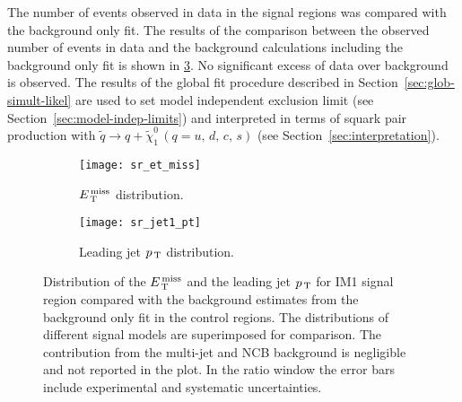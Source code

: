 The number of events observed in data in the signal regions was compared with
the background only fit. The results of the comparison between the observed
number of events in data and the background calculations including the
background only fit is shown in \cref{fig:sr_plots}. No significant excess of
data over background is observed. The results of the global fit procedure
described in Section~\ref{sec:glob-simult-likel} are used to set model
independent exclusion limit (see Section~\ref{sec:model-indep-limits}) and
interpreted in terms of squark pair production with
$\widetilde{q} \rightarrow q + \widetilde{\chi}_1^0\, (q = u,\, d,\, c,\, s)$
(see Section~\ref{sec:interpretation}).
\begin{figure}[!th]
  \centering
  \begin{subfigure}[t]{.48\linewidth}
    \texttt{[image: sr\_et\_miss]}
    \caption{$E_\mathrm{\, T}^\mathrm{\, miss}$ distribution.}
    \label{fig:sr_et_miss}
  \end{subfigure}
  \begin{subfigure}[t]{.48\linewidth}
    \texttt{[image: sr\_jet1\_pt]}
    \caption{Leading jet $p_\mathrm{\, T}$ distribution.}
    \label{fig:sr_jet1_pt}
  \end{subfigure}
  \caption{Distribution of the $E_\mathrm{\, T}^\mathrm{\, miss}$ and the leading jet $p_\mathrm{\, T}$ for IM1 signal
    region compared with the background estimates from the background only fit
    in the control regions. The distributions of different signal models are
    superimposed for comparison. The contribution from the multi-jet and NCB
    background is negligible and not reported in the plot. In the ratio window
    the error bars include experimental and systematic uncertainties.}
  \label{fig:sr_plots}
\end{figure}
